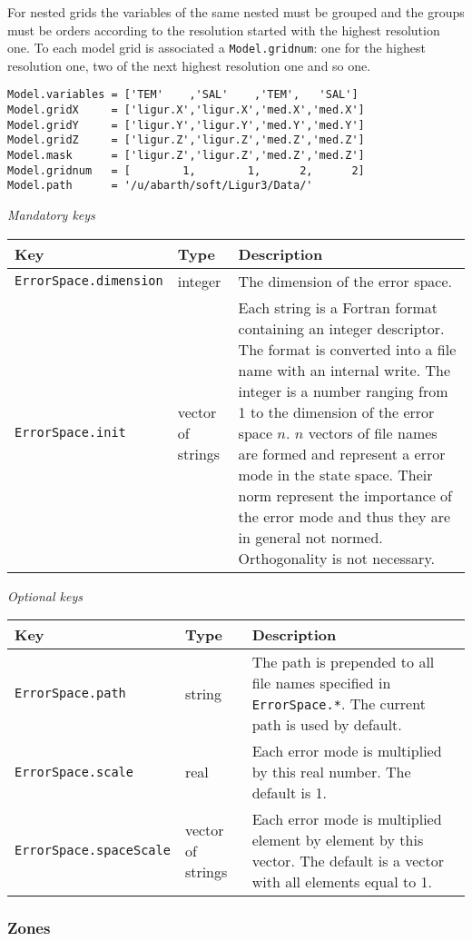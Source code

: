 \documentclass[a4paper,12pt]{article}
\newcommand{\code}{\texttt}
\newenvironment{keytabular}{\begin{tabular}{|p{0.3\textwidth}|p{0.2\textwidth}|p{0.5\textwidth}|} \hline Key & Type & Description \\ \hline \hline }{\end{tabular}}
\newcommand{\subsubsubsection}[1]{\bigskip \textit{#1} \medskip}
\begin{document}
{%
For nested grids the variables of the same nested must be grouped
and the groups must be orders according to the resolution started with
the highest resolution one. To each model grid is associated a
\code{Model.gridnum}: one for the highest resolution one, two of the
next highest resolution one and so one.

\begin{verbatim} 
Model.variables = ['TEM'    ,'SAL'    ,'TEM',   'SAL'] 
Model.gridX     = ['ligur.X','ligur.X','med.X','med.X'] 
Model.gridY     = ['ligur.Y','ligur.Y','med.Y','med.Y'] 
Model.gridZ     = ['ligur.Z','ligur.Z','med.Z','med.Z'] 
Model.mask      = ['ligur.Z','ligur.Z','med.Z','med.Z'] 
Model.gridnum   = [        1,        1,      2,      2] 
Model.path      = '/u/abarth/soft/Ligur3/Data/' 
\end{verbatim}}

\subsubsubsection{Mandatory keys}

\begin{keytabular}
\code{ErrorSpace.dimension} & integer & The dimension of the error space.
\\
\code{ErrorSpace.init} & vector of strings &
Each string is a Fortran format containing an integer descriptor. The format is converted into a
file name with an internal write. The integer is a number ranging from 1
to the dimension of the error space $n$. $n$ vectors of file names are
formed and represent a error mode in the state space. Their norm
represent the importance of the error mode and thus they are in
general not normed. Orthogonality is not necessary.
\\
\hline
\end{keytabular}

\subsubsubsection{Optional keys}

\begin{keytabular}
\code{ErrorSpace.path} & string &  The path is prepended to all file names
specified in \code{ErrorSpace.*}. The current path is used by default.
\\
\code{ErrorSpace.scale} & real &
Each error mode is multiplied by this real number. The default is 1.
\\
\code{ErrorSpace.spaceScale} & vector of strings &
Each error mode is multiplied element by element by this vector. The
default is a vector with all elements equal to 1.
\\
\hline
\end{keytabular}

\subsubsection{Zones}
\end{document}
